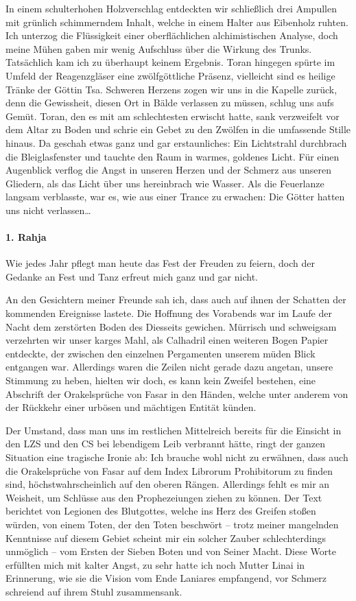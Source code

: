 In einem schulterhohen Holzverschlag entdeckten wir schließlich drei Ampullen mit grünlich schimmerndem Inhalt, welche in einem Halter aus Eibenholz ruhten. Ich unterzog die Flüssigkeit einer oberflächlichen alchimistischen Analyse, doch meine Mühen gaben mir wenig Aufschluss über die Wirkung des Trunks. Tatsächlich kam ich zu überhaupt keinem Ergebnis. Toran hingegen spürte im Umfeld der Reagenzgläser eine zwölfgöttliche Präsenz, vielleicht sind es heilige Tränke der Göttin Tsa. Schweren Herzens zogen wir uns in die Kapelle zurück, denn die Gewissheit, diesen Ort in Bälde verlassen zu müssen, schlug uns aufs Gemüt. Toran, den es mit am schlechtesten erwischt hatte, sank verzweifelt vor dem Altar zu Boden und schrie ein Gebet zu den Zwölfen in die umfassende Stille hinaus. Da geschah etwas ganz und gar erstaunliches: Ein Lichtstrahl durchbrach die Bleiglasfenster und tauchte den Raum in warmes, goldenes Licht. Für einen Augenblick verflog die Angst in unseren Herzen und der Schmerz aus unseren Gliedern, als das Licht über uns hereinbrach wie Wasser. Als die Feuerlanze langsam verblasste, war es, wie aus einer Trance zu erwachen: Die Götter hatten uns nicht verlassen\dots

\paragraph{1. Rahja} Wie jedes Jahr pflegt man heute das Fest der Freuden zu feiern, doch der Gedanke an Fest und Tanz erfreut mich ganz und gar nicht.


An den Gesichtern meiner Freunde sah ich, dass auch auf ihnen der Schatten der kommenden Ereignisse lastete. Die Hoffnung des Vorabends war im Laufe der Nacht dem zerstörten Boden des Diesseits gewichen. Mürrisch und schweigsam verzehrten wir unser karges Mahl, als Calhadril einen weiteren Bogen Papier entdeckte, der zwischen den einzelnen Pergamenten unserem müden Blick entgangen war. Allerdings waren die Zeilen nicht gerade dazu angetan, unsere Stimmung zu heben, hielten wir doch, es kann kein Zweifel bestehen, eine Abschrift der Orakelsprüche von Fasar in den Händen, welche unter anderem von der Rückkehr einer urbösen und mächtigen Entität künden.


Der Umstand, dass man uns im restlichen Mittelreich bereits für die Einsicht in den LZS und den CS bei lebendigem Leib verbrannt hätte, ringt der ganzen Situation eine tragische Ironie ab: Ich brauche wohl nicht zu erwähnen, dass auch die Orakelsprüche von Fasar auf dem Index Librorum Prohibitorum zu finden sind, höchstwahrscheinlich auf den oberen Rängen. Allerdings fehlt es mir an Weisheit, um Schlüsse aus den Prophezeiungen ziehen zu können. Der Text berichtet von Legionen des Blutgottes, welche ins Herz des Greifen stoßen würden, von einem Toten, der den Toten beschwört -- trotz meiner mangelnden Kenntnisse auf diesem Gebiet scheint mir ein solcher Zauber schlechterdings unmöglich -- vom Ersten der Sieben Boten und von Seiner Macht. Diese Worte erfüllten mich mit kalter Angst, zu sehr hatte ich noch Mutter Linai in Erinnerung, wie sie die Vision vom Ende Laniares empfangend, vor Schmerz schreiend auf ihrem Stuhl zusammensank.


